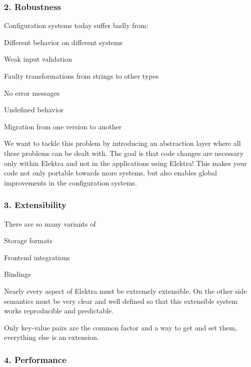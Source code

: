 \subsubsection*{2. Robustness}

Configuration systems today suffer badly from\+:


\begin{DoxyItemize}
\item Different behavior on different systems
\item Weak input validation
\item Faulty transformations from strings to other types
\item No error messages
\item Undefined behavior
\item Migration from one version to another
\end{DoxyItemize}

We want to tackle this problem by introducing an abstraction layer where all these problems can be dealt with. The goal is that code changes are necessary only within Elektra and not in the applications using Elektra! This makes your code not only portable towards more systems, but also enables global improvements in the configuration systems.

\subsubsection*{3. Extensibility}

There are so many variants of


\begin{DoxyItemize}
\item Storage formats
\item Frontend integrations
\item Bindings
\end{DoxyItemize}

Nearly every aspect of Elektra must be extremely extensible. On the other side semantics must be very clear and well defined so that this extensible system works reproducible and predictable.

Only key-\/value pairs are the common factor and a way to get and set them, everything else is an extension.

\subsubsection*{4. Performance}

